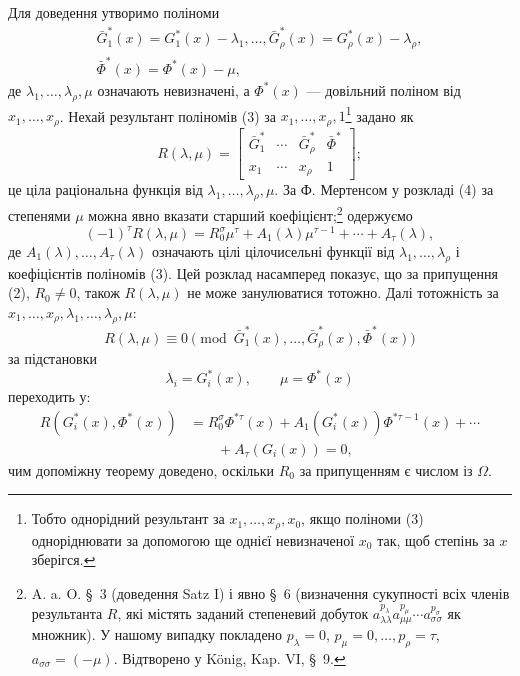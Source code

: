\documentclass[11pt]{article}
\begin{document}
Для доведення утворимо поліноми
\begin{equation}
\begin{gathered}
  \bar G_1^*(x)=G_1^*(x)-\lambda_1,
  \ldots,
  \bar G_\rho^*(x)=G_\rho^*(x)-\lambda_\rho,\\
  \bar\Phi^*(x)=\Phi^*(x)-\mu,
\end{gathered}
\tag{3}
\end{equation}
де $\lambda_1,\ldots,\lambda_\rho,\mu$ означають невизначені, а $\Phi^*(x)$ --- довільний поліном від $x_1,\ldots,x_\rho$. Нехай результант поліномів (3) за $x_1,\ldots,x_\rho,1$\footnote{Тобто однорідний результант за $x_1,\ldots,x_\rho,x_0$, якщо поліноми (3) одноріднювати за допомогою ще однієї невизначеної $x_0$ так, щоб степінь за $x$ зберігся.} задано як
\begin{equation}
  R(\lambda,\mu)=\left[
  \begin{array}{cccc}
   \bar G_1^*&\cdots&\bar G_\rho^*&\bar\Phi^*\\
   x_1&\cdots&x_\rho&1
  \end{array}
  \right];
\tag{4}
\end{equation}
це ціла раціональна функція від $\lambda_1,\ldots,\lambda_\rho,\mu$. За Ф. Мертенсом у розкладі (4) за степенями $\mu$ можна явно вказати старший коефіцієнт;\footnote{A. a. O. \S\ 3 (доведення Satz I) і явно \S\ 6 (визначення сукупності всіх членів результанта $R$, які містять заданий степеневий добуток $a_{\lambda\lambda}^{p_\lambda} a_{\mu\mu}^{p_\mu}\cdots a_{\sigma\sigma}^{p_\sigma}$ як множник). У нашому випадку покладено $p_\lambda=0$, $p_\mu=0,\ldots,p_\rho=\tau$, $a_{\sigma\sigma}=(-\mu)$. Відтворено у König, Kap. VI, \S\ 9.} одержуємо
\begin{equation}
  (-1)^\tau R(\lambda,\mu)
  =R_0^\sigma\mu^\tau+A_1(\lambda)\mu^{\tau-1}+\cdots+A_\tau(\lambda),
\tag{5}
\end{equation}
де $A_1(\lambda),\ldots,A_\tau(\lambda)$ означають цілі цілочисельні функції від $\lambda_1,\ldots,\lambda_\rho$ і коефіцієнтів поліномів (3). Цей розклад насамперед показує, що за припущення (2), $R_0\ne0$, також $R(\lambda,\mu)$ не може занулюватися тотожно. Далі тотожність за $x_1,\ldots,x_\rho,\lambda_1,\ldots,\lambda_\rho,\mu$:
\[
  R(\lambda,\mu)\equiv 0\pmod{\bar G_1^*(x),\ldots,
  \bar G_\rho^*(x),\bar\Phi^*(x)}
\]
за підстановки
\[
  \lambda_i=G_i^*(x),\qquad \mu=\Phi^*(x)
\]
переходить у:
\begin{equation}
\begin{aligned}
  R(G_i^*(x),\Phi^*(x))
  &=R_0^\sigma\Phi^{*\tau}(x)
    +A_1(G_i^*(x))\Phi^{*\tau-1}(x)+\cdots \\
  &\qquad +A_\tau(G_i(x))=0,
\end{aligned}
\tag{6}
\end{equation}
чим допоміжну теорему доведено, оскільки $R_0$ за припущенням є числом із $\Omega$.
\end{document}
